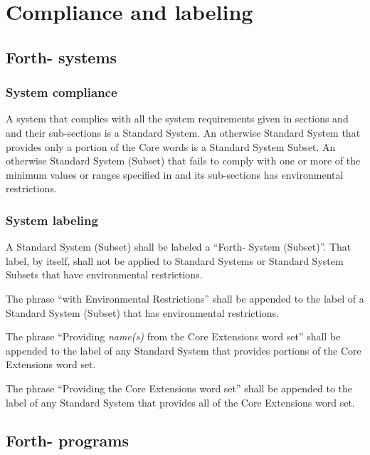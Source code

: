\chapter{Compliance and labeling}
\label{label}

\section{Forth-\snapshot{} systems} %
\label{label:label}

\subsection{System compliance} %
\label{label:system}

A system that complies with all the system requirements given in
sections  and  and their sub-sections is
a Standard System. An otherwise Standard System that provides only
a portion of the Core words is a Standard System Subset. An
otherwise Standard System (Subset) that fails to comply with one or
more of the minimum values or ranges specified in  and
its sub-sections has environmental restrictions.

\subsection{System labeling} %

A Standard System (Subset) shall be labeled a ``Forth-\snapshot{} System
(Subset)''. That label, by itself, shall not be applied to Standard
Systems or Standard System Subsets that have environmental
restrictions.

The phrase ``with Environmental Restrictions'' shall be appended to
the label of a Standard System (Subset) that has environmental
restrictions.

The phrase ``Providing \emph{name(s)} from the Core Extensions word
set'' shall be appended to the label of any Standard System that
provides portions of the Core Extensions word set.

The phrase ``Providing the Core Extensions word set'' shall be
appended to the label of any Standard System that provides all of
the Core Extensions word set.

\section{Forth-\snapshot{} programs} %
